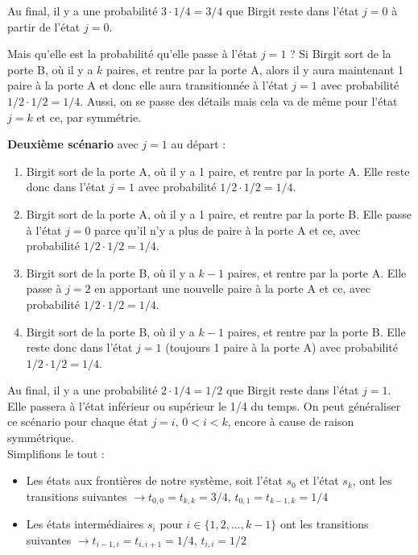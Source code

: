 \documentclass{article}
\begin{document}
    Au final, il y a une probabilité \(3 \cdot 1/4 = 3/4\) que Birgit reste dans l'état $j = 0$ à partir de l'état $j = 0$. 
    
    \vspace{.2cm}
    Mais qu'elle est la probabilité qu'elle passe à l'état $j = 1$ ? Si Birgit sort de la porte B, où il y a $k$ paires, et rentre par la porte A, alors il y aura maintenant 1 paire à la porte A et donc elle aura transitionnée 
    à l'état $j= 1$ avec probabilité \(1/2 \cdot 1/2 = 1/4\). Aussi, on se passe des détails mais cela va de même pour l'état $j = k$ et ce, par symmétrie.

    \vspace{.2cm}
    \textbf{Deuxième scénario} avec $j = 1$ au départ :
    \begin{enumerate}[left=1cm]
        \item Birgit sort de la porte A, où il y a 1 paire, et rentre par la porte A. Elle reste donc dans l'état $j = 1$ avec probabilité $1/2 \cdot 1/2 = 1/4$.
        \item Birgit sort de la porte A, où il y a 1 paire, et rentre par la porte B. Elle passe à l'état $j = 0$ parce qu'il n'y a plus de paire à la porte A et ce, avec probabilité $1/2 \cdot 1/2 = 1/4$.
        \item Birgit sort de la porte B, où il y a $k - 1$ paires, et rentre par la porte A. Elle passe à $j = 2$ en apportant une nouvelle paire à la porte A et ce, avec probabilité $1/2 \cdot 1/2 = 1/4$.
        \item Birgit sort de la porte B, où il y a $k - 1$ paires, et rentre par la porte B. Elle reste donc dans l'état $j = 1$ (toujours 1 paire à la porte A) avec probabilité $1/2 \cdot 1/2 = 1/4$.
    \end{enumerate}

    Au final, il y a une probabilité \(2 \cdot 1/4 = 1/2\) que Birgit reste dans l'état $j = 1$. Elle passera à l'état inférieur ou supérieur le 1/4 du temps. On peut généraliser ce scénario pour chaque état $j = i,\, 0 < i < k$, encore à cause de raison symmétrique. \\

    Simplifions le tout :
    \begin{itemize}[left=1cm]
        \item Les états aux frontières de notre système, soit l'état $s_0$ et l'état $s_k$, ont les transitions suivantes \(\rightarrow t_{0,0} = t_{k,k} = 3/4,\, t_{0,1} = t_{k-1, k} = 1/4 \)
        \item Les états intermédiaires $s_i$ pour \(i\in\{1,2,...,k-1\}\) ont les transitions suivantes \(\rightarrow t_{i-1,i} = t_{i, i+1} = 1/4,\, t_{i,i} = 1/2\)
    \end{itemize}
\end{document}
